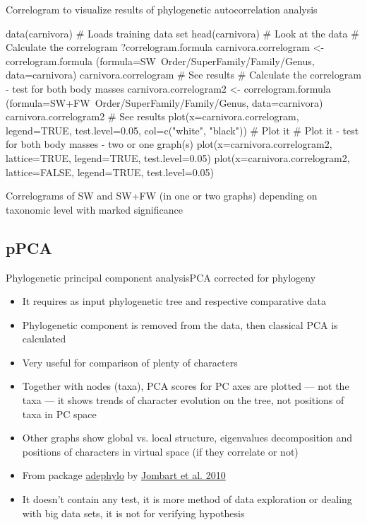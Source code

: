 \documentclass[compress, ucs, xelatex, 11pt, xcolor=svgnames, aspectratio=169,
	hyperref={
		bookmarks=true,
		unicode=true,
		colorlinks=true,
		pdftitle={Molecular data in R},
		plainpages=false,
		pdfauthor={Vojtech Zeisek},
		pdfsubject={Course about phylogeny and evolution in R},
		pdfcreator={XeLaTeX},
		pdfkeywords={R, evolution, phylogeny, molecular data},
		linkcolor=Crimson, %
		anchorcolor=Magenta, %
		citecolor=Magenta, %
		filecolor=Magenta, %
		menucolor=Magenta, %
		urlcolor=DodgerBlue, %
		pdftex},
	url={hyphens, lowtilde} %
	]{beamer}
\renewcommand{\texttt}[1]{\colorbox{Beige}{{\ttfamily #1}}}
\begin{document}
\begin{frame}[fragile]{Correlogram to visualize results of phylogenetic autocorrelation analysis}
	\begin{spluscode}
    data(carnivora) # Loads training data set
    head(carnivora) # Look at the data
    # Calculate the correlogram
    ?correlogram.formula
    carnivora.correlogram <- correlogram.formula
      (formula=SW~Order/SuperFamily/Family/Genus, data=carnivora)
    carnivora.correlogram # See results
    # Calculate the correlogram - test for both body masses
    carnivora.correlogram2 <- correlogram.formula
      (formula=SW+FW~Order/SuperFamily/Family/Genus, data=carnivora)
    carnivora.correlogram2 # See results
    plot(x=carnivora.correlogram, legend=TRUE, test.level=0.05, col=c("white",
      "black")) # Plot it
    # Plot it - test for both body masses - two or one graph(s)
    plot(x=carnivora.correlogram2, lattice=TRUE, legend=TRUE, test.level=0.05)
    plot(x=carnivora.correlogram2, lattice=FALSE, legend=TRUE, test.level=0.05)
	\end{spluscode}
\end{frame}

\begin{frame}{Correlograms of SW and SW+FW (in one or two graphs) depending on taxonomic level with marked significance}
	\texttt{[image: correlog.png]}
\end{frame}

\subsection{pPCA}

\begin{frame}{Phylogenetic principal component analysis}{PCA corrected for phylogeny}
	\begin{itemize}
		\item It requires as input phylogenetic tree and respective comparative data
		\item Phylogenetic component is removed from the data, then classical PCA is calculated
		\item Very useful for comparison of plenty of characters
		\item Together with nodes (taxa), PCA scores for PC axes are plotted --- not the taxa --- it shows trends of character evolution on the tree, not positions of taxa in PC space
		\item Other graphs show global vs. local structure, eigenvalues decomposition and positions of characters in virtual space (if they correlate or not)
		\item From package \href{https://academic.oup.com/bioinformatics/article/26/15/1907/188748}{adephylo} by \href{https://www.sciencedirect.com/science/article/pii/S0022519310001736}{Jombart et al. 2010}
		\item It doesn't contain any test, it is more method of data exploration or dealing with big data sets, it is not for verifying hypothesis
	\end{itemize}
\end{frame}
\end{document}
